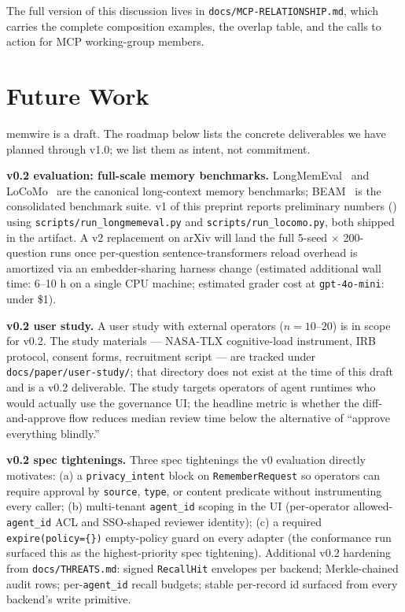 \documentclass[11pt,letterpaper,twocolumn]{article}
\begin{document}
The full version of this discussion lives in \texttt{docs/MCP-RELATIONSHIP.md}, which carries the complete composition examples, the overlap table, and the calls to action for MCP working-group members.

\section{Future Work}
\label{sec:future}

memwire is a draft. The roadmap below lists the concrete deliverables we have planned through v1.0; we list them as intent, not commitment.

\textbf{v0.2 evaluation: full-scale memory benchmarks.} LongMemEval~\cite{wu2024longmemeval} and LoCoMo~\cite{maharana2024locomo} are the canonical long-context memory benchmarks; BEAM~\cite{beam_benchmark} is the consolidated benchmark suite. v1 of this preprint reports preliminary numbers () using \texttt{scripts/run\_longmemeval.py} and \texttt{scripts/run\_locomo.py}, both shipped in the artifact. A v2 replacement on arXiv will land the full 5-seed $\times$ 200-question runs once per-question sentence-transformers reload overhead is amortized via an embedder-sharing harness change (estimated additional wall time: 6--10 h on a single CPU machine; estimated grader cost at \texttt{gpt-4o-mini}: under \$1).

\textbf{v0.2 user study.} A user study with external operators ($n=10$--$20$) is in scope for v0.2. The study materials --- NASA-TLX cognitive-load instrument, IRB protocol, consent forms, recruitment script --- are tracked under \texttt{docs/paper/user-study/}; that directory does not exist at the time of this draft and is a v0.2 deliverable. The study targets operators of agent runtimes who would actually use the governance UI; the headline metric is whether the diff-and-approve flow reduces median review time below the alternative of ``approve everything blindly.''

\textbf{v0.2 spec tightenings.} Three spec tightenings the v0 evaluation directly motivates: (a) a \texttt{privacy\_intent} block on \texttt{RememberRequest} so operators can require approval by \texttt{source}, \texttt{type}, or content predicate without instrumenting every caller; (b) multi-tenant \texttt{agent\_id} scoping in the UI (per-operator allowed-\texttt{agent\_id} ACL and SSO-shaped reviewer identity); (c) a required \texttt{expire(policy=\{\})} empty-policy guard on every adapter (the  conformance run surfaced this as the highest-priority spec tightening). Additional v0.2 hardening from \texttt{docs/THREATS.md}: signed \texttt{RecallHit} envelopes per backend; Merkle-chained audit rows; per-\texttt{agent\_id} recall budgets; stable per-record id surfaced from every backend's write primitive.
\end{document}
